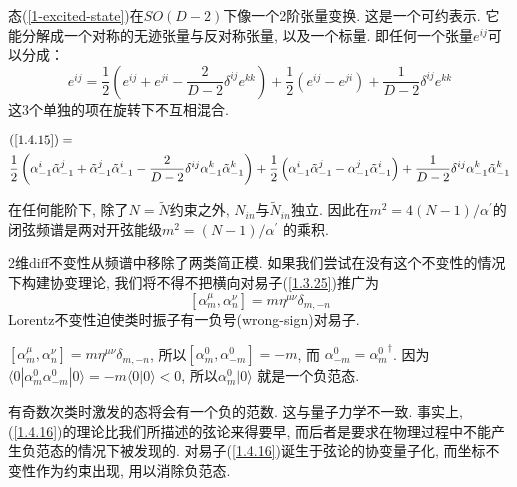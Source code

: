 态(\ref{1-excited-state})在$SO(D-2)$下像一个2阶张量变换. 这是一个可约表示. 它能分解成一个对称的无迹张量与反对称张量, 以及一个标量. 即任何一个张量$e^{ij}$可以分成：
\begin{equation}
e^{i j}=\frac{1}{2}\left(e^{i j}+e^{j i}-\frac{2}{D-2} \delta^{i j} e^{k k}\right)+\frac{1}{2}\left(e^{i j}-e^{j i}\right)+\frac{1}{D-2} \delta^{i j} e^{k k} \label{1.4.15}
\end{equation}
这3个单独的项在旋转下不互相混合. 
\begin{tcolorbox}
    \begin{remark}
        \begin{align*}
            &(\ref{1.4.15})= \\
            &\frac{1}{2}\left(\alpha_{-1}^{i} \tilde{\alpha}_{-1}^{j}+\tilde{\alpha}_{-1}^{j} \tilde{\alpha}_{-1}^{i}-\frac{2}{D-2} \delta^{i j} \alpha_{-1}^{k} \tilde{\alpha}_{-1}^{k}\right)
            +\frac{1}{2}\left(\alpha_{-1}^{i} \tilde{\alpha}_{-1}^{j}-\alpha_{-1}^{j} \tilde{\alpha}_{-1}^{i}\right)
            +\frac{1}{D-2} \delta^{i j} \alpha_{-1}^{k} \tilde{\alpha}_{-1}^{k} 
        \end{align*}
        \end{remark}
\end{tcolorbox}



在任何能阶下, 除了$N=\tilde{N}$约束之外, $N_{in}$与$\tilde{N}_{in}$独立. 因此在$m^{2}=4(N-1)/\alpha^{\prime}$的闭弦频谱是两对开弦能级$m^{2}=(N-1) / \alpha^{\prime}$ 的乘积. 

2维diff不变性从频谱中移除了两类简正模. 如果我们尝试在没有这个不变性的情况下构建协变理论, 我们将不得不把横向对易子(\ref{1.3.25})推广为
\begin{equation}
\left[\alpha_{m}^{\mu}, \alpha_{n}^{\nu}\right]=m \eta^{\mu \nu} \delta_{m,-n} \label{1.4.16}
\end{equation}
Lorentz不变性迫使类时振子有一负号(wrong-sign)对易子. 

\begin{remark}
    $\left[\alpha_{m}^{\mu}, \alpha_{n}^{\nu}\right]=m \eta^{\mu \nu} \delta_{m,-n}$, 所以$\left[\alpha_{m}^{0}, \alpha_{-m}^{0}\right]=-m$, 而
$\alpha_{-m}^{0}={\alpha_{m}^{0}}^\dagger$. 因为$\langle 0|\alpha_{m}^{0} \alpha_{-m}^{0}| 0\rangle=-m\langle 0\vert 0\rangle<0$, 所以$\alpha_{m}^{0}\vert 0\rangle$ 就是一个负范态.
\end{remark}
\noindent 有奇数次类时激发的态将会有一个负的范数. 这与量子力学不一致. 
事实上, (\ref{1.4.16})的理论比我们所描述的弦论来得要早, 而后者是要求在物理过程中不能产生负范态的情况下被发现的. 对易子(\ref{1.4.16})诞生于弦论的协变量子化, 而坐标不变性作为约束出现, 用以消除负范态. 


